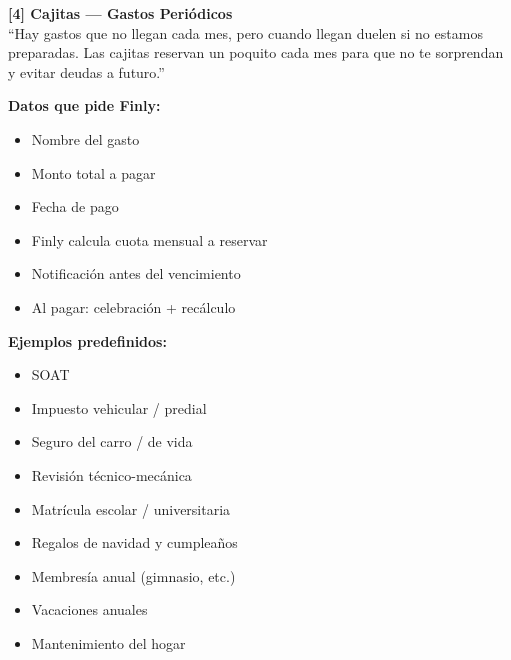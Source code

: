 \documentclass[a4paper,11pt]{article}
\begin{document}
\begin{mdframed}[backgroundcolor=cbg,linecolor=clpink,linewidth=1pt,roundcorner=6pt]
\textbf{\color{cpink}[4] Cajitas --- Gastos Peri\'odicos}\\[4pt]

\textcolor{cdark!70}{\small ``Hay gastos que no llegan cada mes, pero cuando llegan duelen si no
estamos preparadas. Las cajitas reservan un poquito cada mes para que no te sorprendan y
evitar deudas a futuro.''}

\vspace{6pt}
\begin{minipage}[t]{0.47\textwidth}
\textbf{\color{cdark!70}\small Datos que pide Finly:}
\begin{itemize}[leftmargin=*,itemsep=1pt,topsep=2pt]
  \item[\color{cpink}$\bullet$] {\small Nombre del gasto}
  \item[\color{cpink}$\bullet$] {\small Monto total a pagar}
  \item[\color{cpink}$\bullet$] {\small Fecha de pago}
  \item[\color{cpink}$\bullet$] {\small Finly calcula cuota mensual a reservar}
  \item[\color{cpink}$\bullet$] {\small Notificaci\'on antes del vencimiento}
  \item[\color{cpink}$\bullet$] {\small Al pagar: celebraci\'on + rec\'alculo}
\end{itemize}
\end{minipage}
\hfill
\begin{minipage}[t]{0.47\textwidth}
\textbf{\color{cdark!70}\small Ejemplos predefinidos:}
\begin{itemize}[leftmargin=*,itemsep=1pt,topsep=2pt]
  \item[\color{cpink}$\bullet$] {\small SOAT}
  \item[\color{cpink}$\bullet$] {\small Impuesto vehicular / predial}
  \item[\color{cpink}$\bullet$] {\small Seguro del carro / de vida}
  \item[\color{cpink}$\bullet$] {\small Revisi\'on t\'ecnico-mec\'anica}
  \item[\color{cpink}$\bullet$] {\small Matr\'icula escolar / universitaria}
  \item[\color{cpink}$\bullet$] {\small Regalos de navidad y cumplea\~nos}
  \item[\color{cpink}$\bullet$] {\small Membres\'ia anual (gimnasio, etc.)}
  \item[\color{cpink}$\bullet$] {\small Vacaciones anuales}
  \item[\color{cpink}$\bullet$] {\small Mantenimiento del hogar}
\end{itemize}
\end{minipage}
\end{mdframed}
\end{document}
